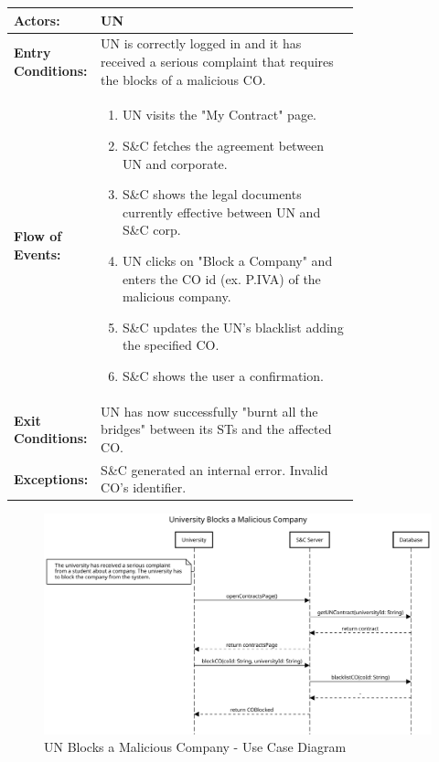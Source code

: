\begin{center}
    \begin{longtable}{|l|p{0.75\linewidth}|}
        \hline
        \textbf{Actors:}           & UN                                                                                                            \\
        \hline
        \textbf{Entry Conditions:} & UN is correctly logged in and it has received a serious complaint that requires the blocks of a malicious CO. \\
        \hline
        \textbf{Flow of Events:}   & \begin{enumerate}
                                         \item UN visits the "My Contract" page.
                                         \item S\&C fetches the agreement between UN and corporate.
                                         \item S\&C shows the legal documents currently effective between UN and S\&C corp.
                                         \item UN clicks on "Block a Company" and enters the CO id (ex. P.IVA) of the malicious company.
                                         \item S\&C updates the UN's blacklist adding the specified CO.
                                         \item S\&C shows the user a confirmation.
                                     \end{enumerate}                \\
        \hline
        \textbf{Exit Conditions:}  & UN has now successfully "burnt all the bridges" between its STs and the affected CO.                          \\
        \hline
        \textbf{Exceptions:}       & S\&C generated an internal error. Invalid CO's identifier.                                                    \\
        \hline
    \end{longtable}
\end{center}

\begin{figure}[H]
    \centering
    \includegraphics[width=1.0\textwidth]{Images/UC_17.pdf}
    \caption{UN Blocks a Malicious Company - Use Case Diagram}
    \label{fig:use-case-diagram-18}
\end{figure}

